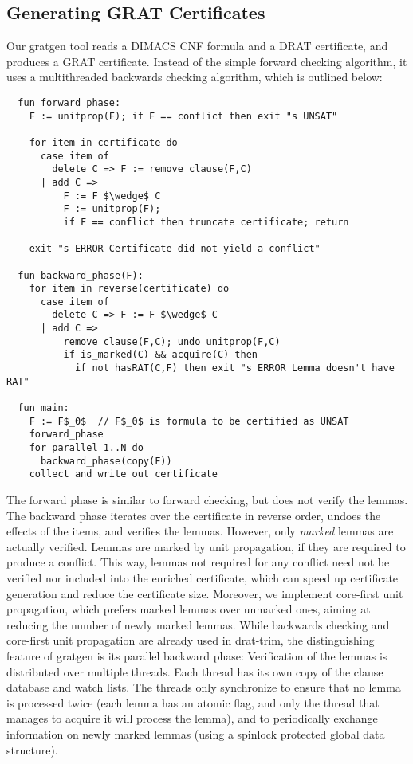 \documentclass{llncs}
\begin{document}

\subsection{Generating GRAT Certificates}  
Our gratgen tool reads a DIMACS CNF formula and a DRAT certificate, and produces a GRAT certificate. 
Instead of the simple forward checking algorithm, it uses a multithreaded backwards checking algorithm, which is outlined below:
\begin{lstlisting}
  fun forward_phase:
    F := unitprop(F); if F == conflict then exit "s UNSAT"
    
    for item in certificate do
      case item of
        delete C => F := remove_clause(F,C)
      | add C =>  
          F := F $\wedge$ C
          F := unitprop(F); 
          if F == conflict then truncate certificate; return
          
    exit "s ERROR Certificate did not yield a conflict"

  fun backward_phase(F):
    for item in reverse(certificate) do
      case item of 
        delete C => F := F $\wedge$ C
      | add C =>
          remove_clause(F,C); undo_unitprop(F,C)
          if is_marked(C) && acquire(C) then
            if not hasRAT(C,F) then exit "s ERROR Lemma doesn't have RAT"
          
  fun main:
    F := F$_0$  // F$_0$ is formula to be certified as UNSAT
    forward_phase
    for parallel 1..N do
      backward_phase(copy(F))
    collect and write out certificate  
\end{lstlisting}
The forward phase is similar to forward checking, but does not verify the lemmas.
The backward phase iterates over the certificate in reverse order, undoes the effects of the items, and verifies the lemmas.
However, only \emph{marked} lemmas are actually verified. Lemmas are marked by unit propagation, if they are required to produce a conflict.
This way, lemmas not required for any conflict need not be verified nor included into the enriched certificate, which can speed up certificate generation and reduce the certificate size.
Moreover, we implement core-first unit propagation, which prefers marked lemmas over unmarked ones, aiming at reducing the number of newly marked lemmas.
While backwards checking and core-first unit propagation are already used in drat-trim, 
the distinguishing feature of gratgen is its parallel backward phase: Verification of the lemmas is distributed over multiple threads.
Each thread has its own copy of the clause database and watch lists. The threads only synchronize to ensure that no lemma is processed 
twice (each lemma has an atomic flag, and only the thread that manages to acquire it will process the lemma), and to periodically exchange information on newly marked lemmas (using a spinlock protected global data structure).
\end{document}
